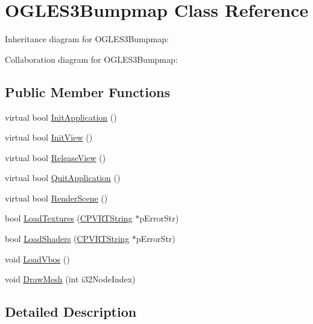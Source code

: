 \hypertarget{class_o_g_l_e_s3_bumpmap}{\section{O\+G\+L\+E\+S3\+Bumpmap Class Reference}
\label{class_o_g_l_e_s3_bumpmap}
}


Inheritance diagram for O\+G\+L\+E\+S3\+Bumpmap\+:


Collaboration diagram for O\+G\+L\+E\+S3\+Bumpmap\+:
\subsection*{Public Member Functions}
\begin{DoxyCompactItemize}
\item 
virtual bool \hyperlink{class_o_g_l_e_s3_bumpmap_a7895c3191b1cbc6d4b76bf3d2796babf}{Init\+Application} ()
\item 
virtual bool \hyperlink{class_o_g_l_e_s3_bumpmap_a0a26ee498a88a53c5422f7013078583c}{Init\+View} ()
\item 
virtual bool \hyperlink{class_o_g_l_e_s3_bumpmap_a899f5b004b5da2b76a94fdeba5210c5e}{Release\+View} ()
\item 
virtual bool \hyperlink{class_o_g_l_e_s3_bumpmap_a66deccaa504a1090b3e389f55c9ae9eb}{Quit\+Application} ()
\item 
virtual bool \hyperlink{class_o_g_l_e_s3_bumpmap_a390f832d5c8208dff4d48c733543516e}{Render\+Scene} ()
\item 
bool \hyperlink{class_o_g_l_e_s3_bumpmap_ae63c88a6a89d8c23ac2effc475bd4e96}{Load\+Textures} (\hyperlink{class_c_p_v_r_t_string}{C\+P\+V\+R\+T\+String} $\ast$p\+Error\+Str)
\item 
bool \hyperlink{class_o_g_l_e_s3_bumpmap_afd6c09f4ac3af367c14f299ccad4dc66}{Load\+Shaders} (\hyperlink{class_c_p_v_r_t_string}{C\+P\+V\+R\+T\+String} $\ast$p\+Error\+Str)
\item 
void \hyperlink{class_o_g_l_e_s3_bumpmap_ada7020c98a55bbb32318239b8f8bc911}{Load\+Vbos} ()
\item 
void \hyperlink{class_o_g_l_e_s3_bumpmap_a3a668c61df01b6cae46b717639b8584a}{Draw\+Mesh} (int i32\+Node\+Index)
\end{DoxyCompactItemize}


\subsection{Detailed Description}


